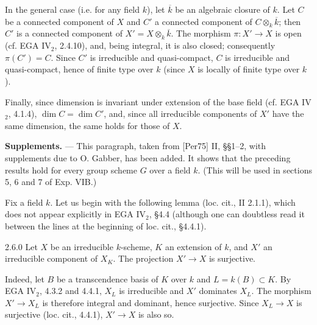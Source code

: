 In the general case (i.e. for any field $k$), let $\overline k$ be an algebraic closure of $k$. Let $C$ be a connected component of $X$ and $C'$ a connected component of $C\otimes_k\overline k$; then $C'$ is a connected component of $X'=X\otimes_k\overline k$. The morphism $\pi:X'\to X$ is open (cf. EGA IV$_2$, 2.4.10), and, being integral, it is also closed; consequently $\pi(C')=C$. Since $C'$ is irreducible and quasi-compact, $C$ is irreducible and quasi-compact, hence of finite type over $k$ (since $X$ is locally of finite type over $k$).

Finally, since dimension is invariant under extension of the base field (cf. EGA IV$_2$, 4.1.4), $\dim C=\dim C'$, and, since all irreducible components of $X'$ have the same dimension, the same holds for those of $X$.

\textbf{Supplements.} --- This paragraph, taken from [Per75] II, §§1--2, with supplements due to O. Gabber, has been added. It shows that the preceding results hold for every group scheme $G$ over a field $k$. (This will be used in sections 5, 6 and 7 of Exp. VIB.)

Fix a field $k$. Let us begin with the following lemma (loc. cit., II 2.1.1), which does not appear explicitly in EGA IV$_2$, §4.4 (although one can doubtless read it between the lines at the beginning of loc. cit., §4.4.1).
\begin{lemma}{2.6.0}\label{VIA.2.6.0}
Let $X$ be an irreducible $k$-scheme, $K$ an extension of $k$, and $X'$ an irreducible component of $X_K$. The projection $X'\to X$ is surjective.
\end{lemma}
Indeed, let $B$ be a transcendence basis of $K$ over $k$ and $L=k(B)\subset K$. By EGA IV$_2$, 4.3.2 and 4.4.1, $X_L$ is irreducible and $X'$ dominates $X_L$. The morphism $X'\to X_L$ is therefore integral and dominant, hence surjective. Since $X_L\to X$ is surjective (loc. cit., 4.4.1), $X'\to X$ is also so.

